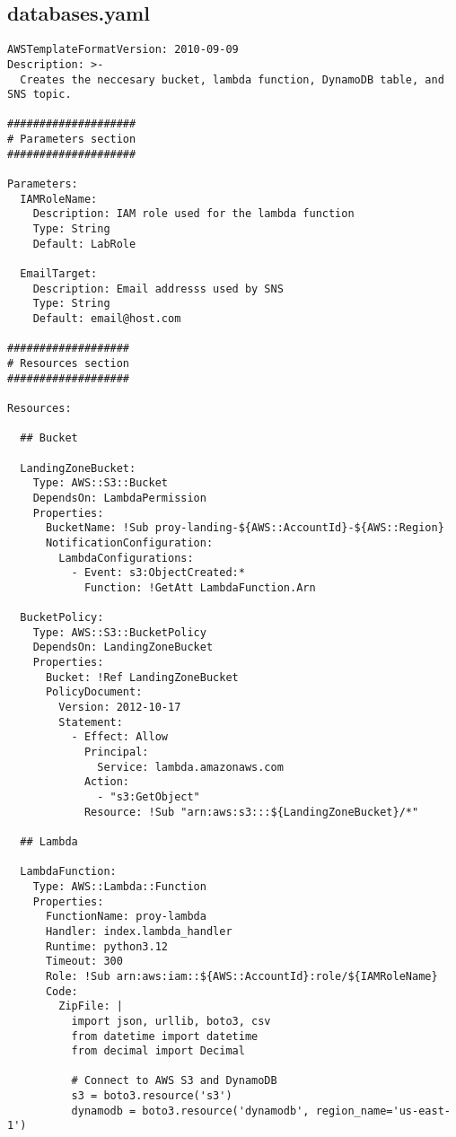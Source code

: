 \subsection{databases.yaml}

\begin{verbatim}
AWSTemplateFormatVersion: 2010-09-09
Description: >-
  Creates the neccesary bucket, lambda function, DynamoDB table, and SNS topic.

####################
# Parameters section
####################

Parameters:
  IAMRoleName:
    Description: IAM role used for the lambda function
    Type: String
    Default: LabRole

  EmailTarget:
    Description: Email addresss used by SNS
    Type: String
    Default: email@host.com

###################
# Resources section
###################

Resources:

  ## Bucket

  LandingZoneBucket:
    Type: AWS::S3::Bucket
    DependsOn: LambdaPermission
    Properties:
      BucketName: !Sub proy-landing-${AWS::AccountId}-${AWS::Region}
      NotificationConfiguration:
        LambdaConfigurations:
          - Event: s3:ObjectCreated:*
            Function: !GetAtt LambdaFunction.Arn

  BucketPolicy:
    Type: AWS::S3::BucketPolicy
    DependsOn: LandingZoneBucket
    Properties:
      Bucket: !Ref LandingZoneBucket
      PolicyDocument:
        Version: 2012-10-17
        Statement:
          - Effect: Allow
            Principal:
              Service: lambda.amazonaws.com
            Action:
              - "s3:GetObject"
            Resource: !Sub "arn:aws:s3:::${LandingZoneBucket}/*"

  ## Lambda

  LambdaFunction:
    Type: AWS::Lambda::Function
    Properties:
      FunctionName: proy-lambda
      Handler: index.lambda_handler
      Runtime: python3.12
      Timeout: 300
      Role: !Sub arn:aws:iam::${AWS::AccountId}:role/${IAMRoleName}
      Code:
        ZipFile: |
          import json, urllib, boto3, csv
          from datetime import datetime
          from decimal import Decimal

          # Connect to AWS S3 and DynamoDB
          s3 = boto3.resource('s3')
          dynamodb = boto3.resource('dynamodb', region_name='us-east-1')


\end{verbatim}
